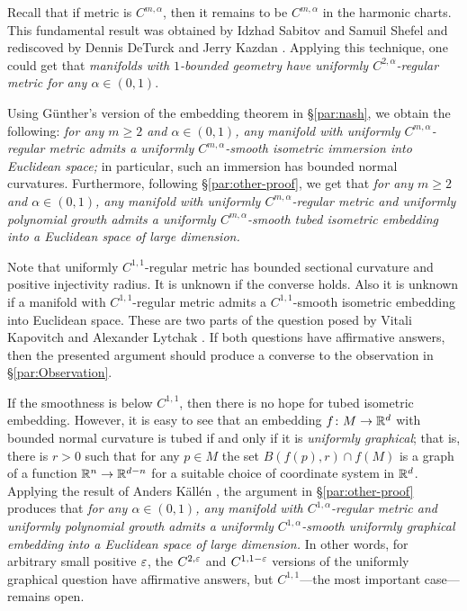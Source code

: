 \documentclass[a4paper,10pt]{article}
\begin{document}
Recall that if metric is $C^{m,\alpha}$, then it remains to be $C^{m,\alpha}$ in the harmonic charts.
This fundamental result was obtained by Idzhad Sabitov and Samuil Shefel \cite{sabitov-shefel} and rediscoved by Dennis DeTurck and Jerry Kazdan \cite{deturck-kazdan}.
Applying this technique, one could get that \textit{manifolds with $1$-bounded geometry have uniformly $C^{2,\alpha}$-regular metric for any $\alpha\in (0,1)$}.

Using Günther's version of the embedding theorem \cite{guenther} in §\ref{par:nash},
we obtain the following: \textit{for any $m\ge 2$ and $\alpha\in(0,1)$, any manifold with uniformly $C^{m,\alpha}$-regular metric admits a uniformly $C^{m,\alpha}$-smooth isometric immersion into Euclidean space;}
in particular, such an immersion has bounded normal curvatures.
Furthermore, following §\ref{par:other-proof}, we get that
\textit{for any $m\ge 2$ and $\alpha\in(0,1)$, any manifold with uniformly $C^{m,\alpha}$-regular metric and uniformly polynomial growth admits a uniformly $C^{m,\alpha}$-smooth tubed isometric embedding into a Euclidean space of large dimension.}

Note that uniformly $C^{1,1}$-regular metric has bounded sectional curvature and positive injectivity radius.
It is unknown if the converse holds.
Also it is unknown if a manifold with $C^{1,1}$-regular metric admits a $C^{1,1}$-smooth isometric embedding into Euclidean space.
These are two parts of the question posed by Vitali Kapovitch and Alexander Lytchak \cite[1.10]{kapovitch-lytchak}.
If both questions have affirmative answers, then the presented argument should produce a converse to the observation in §\ref{par:Observation}.

If the smoothness is below $C^{1,1}$, then there is no hope for tubed isometric embedding.
However, it is easy to see that an embedding $f\colon M\to \mathbb{R}^d$ with bounded normal curvature is tubed if and only if it is \emph{uniformly graphical};
that is, there is $r>0$ such that for any $p\in M$ the set $B(f(p),r)\cap f(M)$ is a graph of a function $\mathbb{R}^n\to \mathbb{R}^{d-n}$ for a suitable choice of coordinate system in $\mathbb{R}^d$.
Applying the result of Anders K\"{a}ll\'{e}n \cite{kallen}, the argument in §\ref{par:other-proof} produces that 
\textit{for any $\alpha\in(0,1)$, any manifold with $C^{1,\alpha}$-regular metric and uniformly polynomial growth admits a  uniformly $C^{1,\alpha}$-smooth uniformly graphical embedding into a Euclidean space of large dimension.}
In other words, for arbitrary small positive $\varepsilon$, the $C^{2,\varepsilon}$ and $C^{1,1-\varepsilon}$ versions of the uniformly graphical question have affirmative answers, but $C^{1,1}$---the most important case---remains open.
\end{document}
